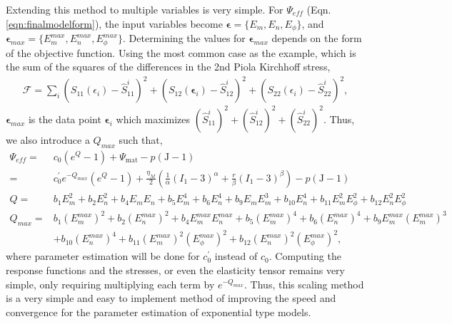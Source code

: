 	Extending this method to multiple variables is very simple. For $\Psi_{eff}$ (Eqn. \ref{eqn:finalmodelform}), the input variables become $\mathbf{\epsilon} = \{E_m, E_n, E_\phi\}$, and $\mathbf{\epsilon}_{max} = \{E_m^{max},E_n^{max},E_\phi^{max}\}$. Determining the values for $\mathbf{\epsilon}_{max}$ depends on the form of the objective function. Using the most common case as the example, which is the sum of the squares of the differences in the 2nd Piola Kirchhoff stress,
\begin{equation}
\begin{aligned}
\mathcal{F} = \sum_i \left(S_{11}(\epsilon_i) - \hat{S}_{11}^i\right)^2 + \left(S_{12}(\mathbf{\epsilon}_i) - \hat{S}_{12}^i\right)^2 + \left(S_{22}(\epsilon_i) - \hat{S}_{22}^i\right)^2,
\end{aligned}
\end{equation}
$\mathbf{\epsilon}_{max}$ is the data point $\mathbf{\epsilon}_i$ which maximizes $\left(\hat{S}_{11}^i\right)^2 + \left(\hat{S}_{12}^i\right)^2 + \left(\hat{S}_{22}^i\right)^2$. 
Thus, we also introduce a $Q_{max}$ such that,
\begin{equation} \label{eqn:finalexponentialmodelformscaled}
\begin{aligned}
\Psi_{eff} 	=& c_0 \left(e^{Q} - 1\right) + \Psi_\mathrm{mat} - p\left(\mathrm{J}-1\right) \\
            =& c_0^\prime e^{-Q_{max}}\left(e^{Q} - 1\right)	
	+ \frac{\eta_M}{2} \left( \frac{1}{\alpha}\left( I_1 -3\right)^{\alpha} + \frac{r}{\beta} \left( I_1 -3\right)^{\beta} \right) - p\left(\mathrm{J}-1\right)\\
Q		=& b_1 E_m^2 + b_2 E_n^2 + b_4 E_m E_n + b_5 E_m^4 + b_6 E_n^4 +
b_9 E_m E_m^3 + b_{10} E_n^4 + b_{11} E_m^2E_\phi^2 + b_{12} E_n^2 E_\phi^2 	\\
Q_{max}	=& b_1 (E_m^{max})^2 + b_2 (E_n^{max})^2 + b_4 E_m^{max} E_n^{max} + b_5 (E_m^{max})^4 + b_6 (E_n^{max})^4 +
b_9 E_m^{max} (E_m^{max})^3 	\\
		&+ b_{10} (E_n^{max})^4 + b_{11} (E_m^{max})^2(E_\phi^{max})^2 + b_{12} (E_n^{max})^2 (E_\phi^{max})^2,
\end{aligned}
\end{equation}
where parameter estimation will be done for $c_0^\prime$ instead of $c_0$. Computing the response functions and the stresses, or even the elasticity tensor remains very simple, only requiring multiplying each term by $e^{-Q_{max}}$. Thus, this scaling method is a very simple and easy to implement method of improving the speed and convergence for the parameter estimation of exponential type models. 




